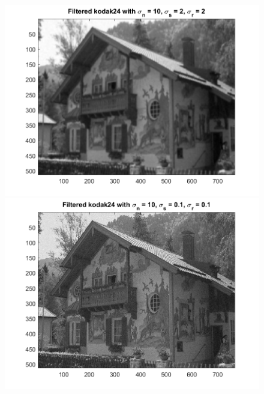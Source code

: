\documentclass{article}
\begin{document}
\begin{figure}[!htb]
    \centering
    \begin{minipage}[b]{0.3\textwidth}
        \includegraphics[width=\textwidth]{kodak24_10_2_2_14.png}
    \end{minipage}
    \begin{minipage}[b]{0.3\textwidth}
        \includegraphics[width=\textwidth]{kodak24_10_0.1_0.1_16.png}
    \end{minipage}
    \begin{minipage}[b]{0.3\textwidth}

\end{minipage}
\end{figure}
\end{document}
